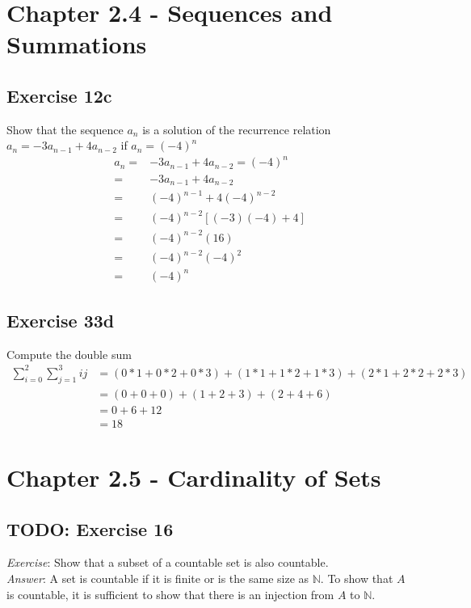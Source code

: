 \documentclass[12pt]{article}
\begin{document}
    \pagebreak     
    \section{Chapter 2.4 - Sequences and Summations}

    \subsection{Exercise 12c}
    Show that the sequence {$a_n$} is a solution of the recurrence relation $a_n=-3a_{n-1}+4a_{n-2}$ if $a_n = (-4)^n$
    \begin{equation}
        \begin{split}
            a_n =& -3a_{n-1}+4a_{n-2} = (-4)^n\\
            =&-3a_{n-1} + 4a_{n-2}\\
            =& (-4)^{n-1}+4(-4)^{n-2}\\
            =& (-4)^{n-2}[(-3)(-4)+4]\\
            =& (-4)^{n-2}(16)\\
            =& (-4)^{n-2}(-4)^2\\
            =& (-4)^{n}
        \end{split}
    \end{equation}

    \subsection{Exercise 33d}
    Compute the double sum
    \begin{equation}
        \begin{split}
            \sum_{i=0}^{2}\sum_{j=1}^{3}ij &= (0*1+0*2+0*3)+(1*1+1*2+1*3)+(2*1+2*2+2*3) \\
            &= (0+0+0) + (1+2+3) + (2+4+6)\\ 
            &= 0 + 6 + 12\\ 
            &= 18 
        \end{split}
    \end{equation}

    \pagebreak     
    \section{Chapter 2.5 - Cardinality of Sets}
    \subsection{TODO: Exercise 16}
    \emph{Exercise}: 
    Show that a subset of a countable set is also countable.\\
    \emph{Answer}:
    A set is countable if it is finite or is the same size as $\mathbb{N}$.
    To show that $A$ is countable, it is sufficient to show that there is an injection
    from $A$ to $\mathbb{N}$.

    
\end{document}
